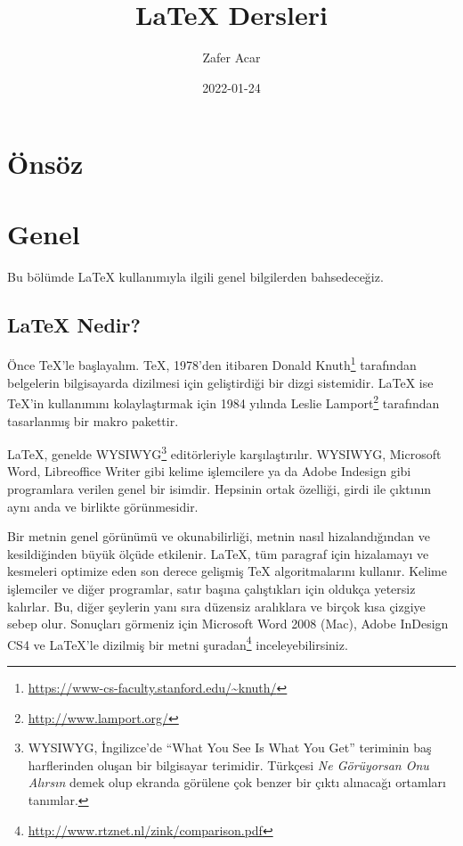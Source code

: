 \documentclass[
  10pt,
]{scrbook}
\title{LaTeX Dersleri}
\author{Zafer Acar}
\date{2022-01-24}
\renewcommand{\href}[2]{#2\footnote{\url{#1}}}
\theoremstyle{definition}
\theoremstyle{definition}
\theoremstyle{definition}
\theoremstyle{definition}
\theoremstyle{remark}
\begin{document}
\maketitle



{
\setcounter{tocdepth}{2}
\tableofcontents
}
\listoffigures
\listoftables
\hypertarget{uxf6nsuxf6z}{%
\chapter*{Önsöz}\label{uxf6nsuxf6z}}

\mainmatter

\hypertarget{genel}{%
\chapter{Genel}\label{genel}}

Bu bölümde LaTeX kullanımıyla ilgili genel bilgilerden bahsedeceğiz.

\hypertarget{latex-nedir}{%
\section{LaTeX Nedir?}\label{latex-nedir}}

Önce TeX'le başlayalım. TeX, 1978'den
itibaren \href{https://www-cs-faculty.stanford.edu/~knuth/}{Donald Knuth} tarafından belgelerin bilgisayarda dizilmesi
için geliştirdiği bir dizgi sistemidir.
LaTeX ise TeX'in kullanımını kolaylaştırmak için 1984 yılında \href{http://www.lamport.org/}{Leslie
Lamport} tarafından tasarlanmış bir makro pakettir.

LaTeX, genelde WYSIWYG\footnote{WYSIWYG, İngilizce'de ``What You See Is What You Get'' teriminin baş harflerinden oluşan bir bilgisayar terimidir. Türkçesi \emph{Ne Görüyorsan Onu Alırsın} demek olup ekranda görülene çok benzer bir çıktı alınacağı ortamları tanımlar.} editörleriyle karşılaştırılır. WYSIWYG, Microsoft
Word, Libreoffice Writer gibi kelime işlemcilere ya da Adobe Indesign
gibi programlara verilen genel bir isimdir. Hepsinin ortak özelliği,
girdi ile çıktının aynı anda ve birlikte görünmesidir.

Bir metnin genel görünümü ve okunabilirliği, metnin nasıl
hizalandığından ve kesildiğinden büyük ölçüde etkilenir. LaTeX, tüm
paragraf için hizalamayı ve kesmeleri optimize eden son derece gelişmiş
TeX algoritmalarını kullanır. Kelime işlemciler ve diğer programlar,
satır başına çalıştıkları için oldukça yetersiz kalırlar. Bu, diğer
şeylerin yanı sıra düzensiz aralıklara ve birçok kısa çizgiye sebep
olur. Sonuçları görmeniz için Microsoft Word 2008 (Mac), Adobe InDesign
CS4 ve LaTeX'le dizilmiş bir metni \href{http://www.rtznet.nl/zink/comparison.pdf}{şuradan} inceleyebilirsiniz.
\end{document}
